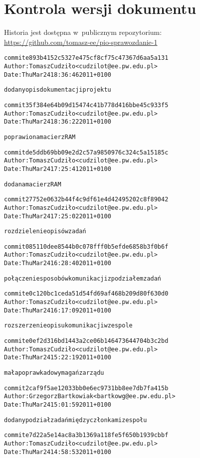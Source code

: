 \documentclass[10pt,a4paper]{article}
\begin{document}
\section{Kontrola wersji dokumentu}
Historia jest dostępna w~publicznym repozytorium:\\
\url{https://github.com/tomasz-ee/pio-sprawozdanie-1}

\begin{alltt}
commit e893b4152c5327e475cf8cf75c47367d6aa5a131
Author: Tomasz Cudziło <cudzilot@ee.pw.edu.pl>
Date:   Thu Mar 24 18:36:46 2011 +0100

    dodany opis dokumentacji projektu

commit 35f384e64b09d15474c41b778d416bbe45c933f5
Author: Tomasz Cudziło <cudzilot@ee.pw.edu.pl>
Date:   Thu Mar 24 18:36:22 2011 +0100

    poprawiona macierz RAM

commit de5ddb69bb09e2d2c57a9850976c324c5a15185c
Author: Tomasz Cudziło <cudzilot@ee.pw.edu.pl>
Date:   Thu Mar 24 17:25:41 2011 +0100

    dodana macierz RAM

commit 27752e0632b44f4c9df61e4d42495202c8f89042
Author: Tomasz Cudziło <cudzilot@ee.pw.edu.pl>
Date:   Thu Mar 24 17:25:02 2011 +0100

    rozdzielenie opisów zadań

commit 085110dee8544b0c078fff0b5efde6858b3f0b6f
Author: Tomasz Cudziło <cudzilot@ee.pw.edu.pl>
Date:   Thu Mar 24 16:28:40 2011 +0100

    połączenie sposobów komunikacji z podziałem zadań

commit e0c120bc1ceda51d54fd69af468b209d80f630d0
Author: Tomasz Cudziło <cudzilot@ee.pw.edu.pl>
Date:   Thu Mar 24 16:17:09 2011 +0100

    rozszerzenie opisu komunikacji w zespole

commit e0ef2d316bd1443a2ce06b146473644704b3c2bd
Author: Tomasz Cudziło <cudzilot@ee.pw.edu.pl>
Date:   Thu Mar 24 15:22:19 2011 +0100

    mała poprawka do wymagań zarządu

commit 2caf9f5ae12033bb0e6ec9731bb8ee7db7fa415b
Author: Grzegorz Bartkowiak <bartkowg@ee.pw.edu.pl>
Date:   Thu Mar 24 15:01:59 2011 +0100

    dodany podział zadań między członkami zespołu

commit e7d22a5e14ac8a3b1369a118fe5f650b1939cbbf
Author: Tomasz Cudziło <cudzilot@ee.pw.edu.pl>
Date:   Thu Mar 24 14:58:53 2011 +0100


\end{alltt}
\end{document}
